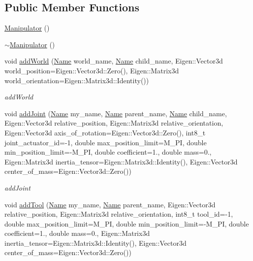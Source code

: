 \subsection*{Public Member Functions}
\begin{DoxyCompactItemize}
\item 
\hyperlink{classrobotis__manipulator_1_1_manipulator_a4c301d01641037e7548a1b87e6103f65}{Manipulator} ()
\item 
\hyperlink{classrobotis__manipulator_1_1_manipulator_a90c57c694c00e9380ccd3c399ef85acf}{$\sim$\+Manipulator} ()
\item 
void \hyperlink{classrobotis__manipulator_1_1_manipulator_a703e6d5646e595281d0352c2d0363327}{add\+World} (\hyperlink{namespacerobotis__manipulator_a08c2d25e77a01ad75b9bb740f8ce4765}{Name} world\+\_\+name, \hyperlink{namespacerobotis__manipulator_a08c2d25e77a01ad75b9bb740f8ce4765}{Name} child\+\_\+name, Eigen\+::\+Vector3d world\+\_\+position=Eigen\+::\+Vector3d\+::\+Zero(), Eigen\+::\+Matrix3d world\+\_\+orientation=Eigen\+::\+Matrix3d\+::\+Identity())
\begin{DoxyCompactList}\small\item\em add\+World \end{DoxyCompactList}\item 
void \hyperlink{classrobotis__manipulator_1_1_manipulator_a55c49ab2eb46afd6595ad9de306042b1}{add\+Joint} (\hyperlink{namespacerobotis__manipulator_a08c2d25e77a01ad75b9bb740f8ce4765}{Name} my\+\_\+name, \hyperlink{namespacerobotis__manipulator_a08c2d25e77a01ad75b9bb740f8ce4765}{Name} parent\+\_\+name, \hyperlink{namespacerobotis__manipulator_a08c2d25e77a01ad75b9bb740f8ce4765}{Name} child\+\_\+name, Eigen\+::\+Vector3d relative\+\_\+position, Eigen\+::\+Matrix3d relative\+\_\+orientation, Eigen\+::\+Vector3d axis\+\_\+of\+\_\+rotation=Eigen\+::\+Vector3d\+::\+Zero(), int8\+\_\+t joint\+\_\+actuator\+\_\+id=-\/1, double max\+\_\+position\+\_\+limit=M\+\_\+\+PI, double min\+\_\+position\+\_\+limit=-\/M\+\_\+\+PI, double coefficient=1., double mass=0., Eigen\+::\+Matrix3d inertia\+\_\+tensor=Eigen\+::\+Matrix3d\+::\+Identity(), Eigen\+::\+Vector3d center\+\_\+of\+\_\+mass=Eigen\+::\+Vector3d\+::\+Zero())
\begin{DoxyCompactList}\small\item\em add\+Joint \end{DoxyCompactList}\item 
void \hyperlink{classrobotis__manipulator_1_1_manipulator_a55b0500cb070eef28b7c133dacd98d38}{add\+Tool} (\hyperlink{namespacerobotis__manipulator_a08c2d25e77a01ad75b9bb740f8ce4765}{Name} my\+\_\+name, \hyperlink{namespacerobotis__manipulator_a08c2d25e77a01ad75b9bb740f8ce4765}{Name} parent\+\_\+name, Eigen\+::\+Vector3d relative\+\_\+position, Eigen\+::\+Matrix3d relative\+\_\+orientation, int8\+\_\+t tool\+\_\+id=-\/1, double max\+\_\+position\+\_\+limit=M\+\_\+\+PI, double min\+\_\+position\+\_\+limit=-\/M\+\_\+\+PI, double coefficient=1., double mass=0., Eigen\+::\+Matrix3d inertia\+\_\+tensor=Eigen\+::\+Matrix3d\+::\+Identity(), Eigen\+::\+Vector3d center\+\_\+of\+\_\+mass=Eigen\+::\+Vector3d\+::\+Zero())

\end{DoxyCompactItemize}
